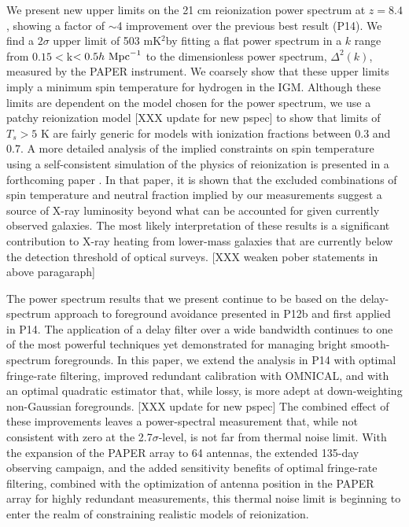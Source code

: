 \documentclass[twocolumn,numberedappendix]{emulateapj} \shorttitle{New Limits on the 21 cm Power Spectrum at $z=8.4$}
\newcommand{\hMpci}{h\ {\rm Mpc}^{-1}}
\newcommand{\mKsqlimit}{503 mK$^2$}
\begin{document}
We present new upper limits on the 21 cm reionization power spectrum at $z=8.4$,
showing a factor of $\sim$4 improvement over the previous best result (P14).
We find a $2\sigma$ upper limit of \mKsqlimit by fitting a
flat power spectrum in a $k$ range from $0.15<$k$<0.5\hMpci$ to the
dimensionless power spectrum, $\Delta^{2}(k)$, measured by the PAPER instrument. 
We coarsely show that these upper limits imply a minimum spin
temperature for hydrogen in the IGM.  Although these limits are dependent on
the model chosen for the power spectrum, we use a patchy reionization model
[XXX update for new pspec]
to show that limits of $T_s>5$ K are fairly generic for models with
ionization fractions between 0.3 and 0.7.
A more detailed analysis of the implied constraints on spin temperature using
a self-consistent simulation of the physics of reionization is
presented in a forthcoming paper \citep{pober_et_al2015}.  In that paper,
it is shown that the excluded combinations of spin temperature
and neutral fraction implied by our measurements
suggest a source of X-ray luminosity beyond what can be 
accounted for given currently observed galaxies.  The most likely interpretation
of these results is a significant contribution to X-ray heating from lower-mass
galaxies that are currently below the detection threshold of optical surveys.
[XXX weaken pober statements in above paragaraph]

The power spectrum results that we present continue to be based on
the delay-spectrum approach to foreground avoidance presented in 
P12b and first applied in P14.  The application of a delay filter over
a wide bandwidth continues to one of the most powerful techniques yet
demonstrated for managing bright smooth-spectrum foregrounds.  In this
paper, we extend the analysis in P14 with optimal fringe-rate filtering,
improved redundant calibration with OMNICAL, and with an optimal quadratic
estimator that, while lossy, is more adept at down-weighting non-Gaussian foregrounds.
[XXX update for new pspec]
The combined effect of these improvements leaves a power-spectral measurement that,
while not consistent with zero at the 2.7$\sigma$-level, is not far from thermal
noise limit.  With the expansion of the PAPER array to 64 antennas, the extended 135-day
observing campaign,
and the added sensitivity benefits of optimal fringe-rate filtering, combined with
the optimization of antenna position in the PAPER array for highly redundant
measurements, this thermal
noise limit is beginning to enter the realm of constraining realistic models of reionization.
\end{document}
